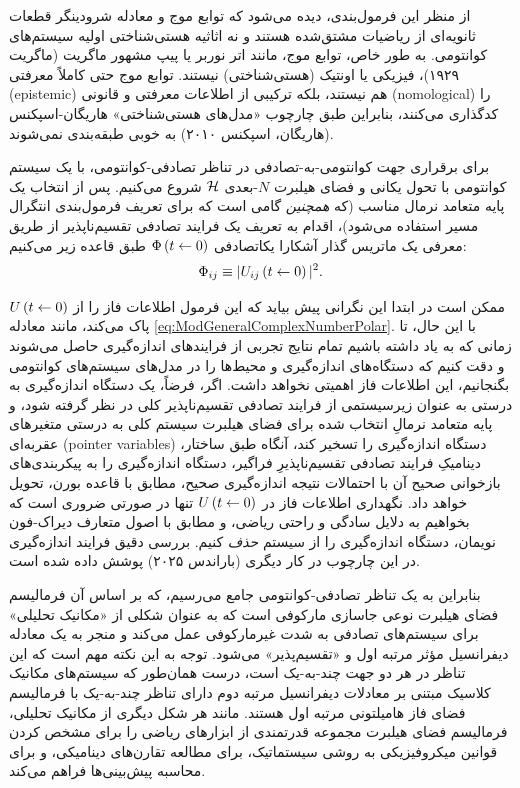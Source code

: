 \documentclass{article}
\newcommand{\stochasticmatrix}{\Phi}
\newcommand{\timeevop}{U}
\begin{document}
از منظر این فرمول‌بندی، دیده می‌شود که توابع موج و معادله شرودینگر قطعات ثانویه‌ای از ریاضیات مشتق‌شده هستند و نه اثاثیه هستی‌شناختی اولیه سیستم‌های کوانتومی. به طور خاص، توابع موج، مانند اتر نوربر یا پیپ مشهور ماگریت (ماگریت ۱۹۲۹)\nocite{Magritte:1929ltdittoi}، فیزیکی یا اونتیک (هستی‌شناختی) نیستند. توابع موج حتی کاملاً معرفتی (epistemic) هم نیستند، بلکه ترکیبی از اطلاعات معرفتی و قانونی (nomological) را کدگذاری می‌کنند، بنابراین طبق چارچوب «مدل‌های هستی‌شناختی» هاریگان-اسپکنس (هاریگان، اسپکنس ۲۰۱۰)\nocite{HarriganSpekkens:2010eievqs} به خوبی طبقه‌بندی نمی‌شوند.

برای برقراری جهت کوانتومی-به-تصادفی در تناظر تصادفی-کوانتومی، با یک سیستم کوانتومی با تحول یکانی و فضای هیلبرت $N$-بعدی $\mathcal{H}$ شروع می‌کنیم. پس از انتخاب یک پایه متعامد نرمال مناسب (که \emph{همچنین} گامی است که برای تعریف فرمول‌بندی انتگرال مسیر استفاده می‌شود)، اقدام به تعریف یک فرایند تصادفی تقسیم‌ناپذیر از طریق معرفی یک ماتریس گذار آشکارا یکاتصادفی $\stochasticmatrix\left(t\from0\right)$ طبق قاعده زیر می‌کنیم:
\begin{equation}
\stochasticmatrix_{ij}\defeq\verts{\timeevop_{ij}\left(t\from0\right)}^{2}.\label{eq:UnistochasticTransitionMatrixFromModSqTimeEvOp}
\end{equation}

ممکن است در ابتدا این نگرانی پیش بیاید که این فرمول اطلاعات فاز را از $\timeevop\left(t\from0\right)$ پاک می‌کند، مانند معادله \eqref{eq:ModGeneralComplexNumberPolar}. با این حال، تا زمانی که به یاد داشته باشیم تمام نتایج تجربی از فرایندهای اندازه‌گیری حاصل می‌شوند و دقت کنیم که دستگاه‌های اندازه‌گیری و محیط‌ها را در مدل‌های سیستم‌های کوانتومی بگنجانیم، این اطلاعات فاز اهمیتی نخواهد داشت. اگر، فرضاً، یک دستگاه اندازه‌گیری به درستی به عنوان زیرسیستمی از فرایند تصادفی تقسیم‌ناپذیر کلی در نظر گرفته شود، و پایه متعامد نرمالِ انتخاب شده برای فضای هیلبرت سیستم کلی به درستی متغیرهای عقربه‌ای (pointer variables) دستگاه اندازه‌گیری را تسخیر کند، آنگاه طبق ساختار، دینامیکِ فرایند تصادفی تقسیم‌ناپذیرِ فراگیر، دستگاه اندازه‌گیری را به پیکربندی‌های بازخوانی صحیح آن با احتمالات نتیجه اندازه‌گیری صحیح، مطابق با قاعده بورن، تحویل خواهد داد. نگهداری اطلاعات فاز در $\timeevop\left(t\from0\right)$ تنها در صورتی ضروری است که بخواهیم به دلایل سادگی و راحتی ریاضی، و مطابق با اصول متعارف دیراک-فون نویمان، دستگاه اندازه‌گیری را از سیستم \emph{حذف} کنیم. بررسی دقیق فرایند اندازه‌گیری در این چارچوب در کار دیگری (باراندس ۲۰۲۵)\nocite{Barandes:2025tsqc} پوشش داده شده است.

بنابراین به یک تناظر تصادفی-کوانتومی جامع می‌رسیم، که بر اساس آن فرمالیسم فضای هیلبرت نوعی جاسازی مارکوفی است که به عنوان شکلی از «مکانیک تحلیلی» برای سیستم‌های تصادفی به شدت غیرمارکوفی عمل می‌کند و منجر به یک معادله دیفرانسیل مؤثر مرتبه اول و «تقسیم‌پذیر» می‌شود. توجه به این نکته مهم است که این تناظر در هر دو جهت چند-به-یک است، درست همان‌طور که سیستم‌های مکانیک کلاسیک مبتنی بر معادلات دیفرانسیل مرتبه دوم دارای تناظر چند-به-یک با فرمالیسم فضای فاز هامیلتونی مرتبه اول هستند. مانند هر شکل دیگری از مکانیک تحلیلی، فرمالیسم فضای هیلبرت مجموعه قدرتمندی از ابزارهای ریاضی را برای مشخص کردن قوانین میکروفیزیکی به روشی سیستماتیک، برای مطالعه تقارن‌های دینامیکی، و برای محاسبه پیش‌بینی‌ها فراهم می‌کند.
\end{document}

